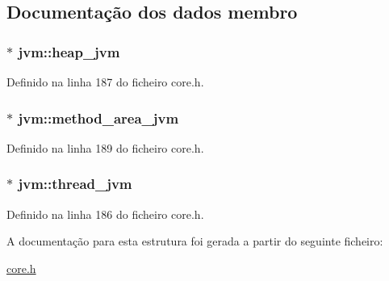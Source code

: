 \subsection{Documentação dos dados membro}
\hypertarget{structjvm_aaa2c1b91d2f8feef91b7e1e8552a873f}{
\subsubsection[{heap\-\_\-jvm}]{$\ast$ jvm\-::heap\-\_\-jvm}}\label{structjvm_aaa2c1b91d2f8feef91b7e1e8552a873f}


Definido na linha 187 do ficheiro core.\-h.

\hypertarget{structjvm_ac8c89a213f0d332aff40faa2661b97e3}{
\subsubsection[{method\-\_\-area\-\_\-jvm}]{$\ast$ jvm\-::method\-\_\-area\-\_\-jvm}}\label{structjvm_ac8c89a213f0d332aff40faa2661b97e3}


Definido na linha 189 do ficheiro core.\-h.

\hypertarget{structjvm_a95875933adbaab4bef10b00738ba0722}{
\subsubsection[{thread\-\_\-jvm}]{$\ast$ jvm\-::thread\-\_\-jvm}}\label{structjvm_a95875933adbaab4bef10b00738ba0722}


Definido na linha 186 do ficheiro core.\-h.



A documentação para esta estrutura foi gerada a partir do seguinte ficheiro\-:\begin{DoxyCompactItemize}
\item 
\hyperlink{core_8h}{core.\-h}\end{DoxyCompactItemize}
